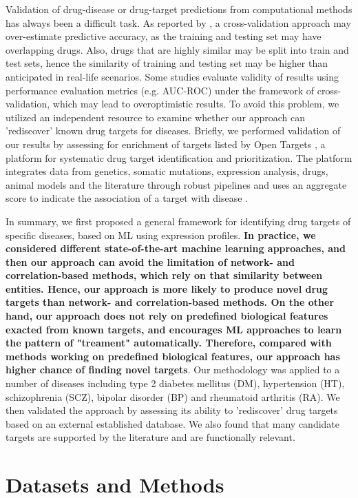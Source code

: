     Validation of drug-disease or drug-target predictions from computational methods has always been a difficult task. As reported by \cite{guney2017reproducible}, a cross-validation approach may over-estimate predictive accuracy, as the training and testing set may have overlapping drugs. Also, drugs that are highly similar may be split into train and test sets, hence the similarity of training and testing set may be higher than anticipated in real-life scenarios. Some studies evaluate validity of results using performance evaluation metrics (e.g. AUC-ROC) under the framework of cross-validation, which may lead to overoptimistic results. To avoid this problem, we utilized an independent resource to examine whether our approach can 'rediscover' known drug targets for diseases. Briefly, we performed validation of our results by assessing for enrichment of targets listed by Open Targets \cite{koscielny2017open}, a platform for systematic drug target identification and prioritization. The platform integrates data from genetics, somatic mutations, expression analysis, drugs, animal models and the literature through robust pipelines and uses an aggregate score to indicate the association of a target with disease \cite{koscielny2017open}.

    In summary, we first proposed a general framework for identifying drug targets of specific diseases, based on ML using expression profiles. \textbf{In practice, we considered different state-of-the-art machine learning approaches, and then our approach can avoid the limitation of network- and correlation-based methods, which rely on that similarity between entities. Hence, our approach is more likely to produce novel drug targets than network- and correlation-based methods. On the other hand, our approach does not rely on predefined biological features exacted from known targets, and encourages ML approaches to learn the pattern of "treament" automatically. Therefore, compared with methods working on predefined biological features, our approach has higher chance of finding novel targets}. Our methodology was applied to a number of diseases including type 2 diabetes mellitus (DM), hypertension (HT), schizophrenia (SCZ), bipolar disorder (BP) and  rheumatoid arthritis (RA). We then validated the approach by assessing its ability to 'rediscover' drug targets based on an external established database. We also found that many candidate targets are supported by the literature and are functionally relevant. 

\section{Datasets and Methods}
